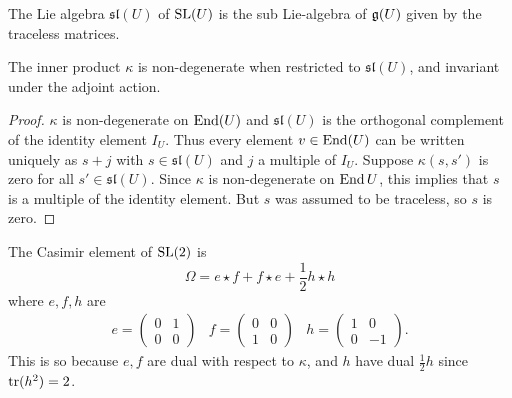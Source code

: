 \documentclass[11pt, english]{article}
\begin{document}
The Lie algebra $\mathfrak{sl}(U)$ of $\operatorname{SL}(U)$ is the sub Lie-algebra of $\mathfrak g(U)$ given by the traceless matrices. 

\begin{lemma}
The inner product $\kappa$ is non-degenerate when restricted to $\mathfrak{sl}(U)$, and invariant under the adjoint action. 
\end{lemma}
\begin{proof}
$\kappa$ is non-degenerate on $\operatorname{End}(U)$ and $\mathfrak{sl}(U)$ is the orthogonal complement of the identity element $I_U$. Thus every element $v \in \operatorname{End}(U)$ can be written uniquely as $s+j$ with $s \in \mathfrak{sl}(U)$ and $j$ a multiple of $I_U$. Suppose $\kappa(s,s')$ is zero for all $s' \in \mathfrak{sl}(U)$. Since $\kappa$ is non-degenerate on $\operatorname{End} U$, this implies that $s$ is a multiple of the identity element. But $s$ was assumed to be traceless, so $s$ is zero. 
\end{proof}

\begin{example}
The Casimir element of $\operatorname{SL}(2)$ is 
\[
\Omega = e \star f + f \star e + \frac 12 h \star h
\]
where $e,f,h$ are
\begin{align*}
  e = 
  \begin{pmatrix}
    0 & 1 \\ 0 & 0 
  \end{pmatrix} &
f = \begin{pmatrix}
0 & 0 \\ 1 & 0 
\end{pmatrix} & 
h = 
\begin{pmatrix}
  1 & 0 \\ 0 & -1
\end{pmatrix}.
\end{align*}
This is so because $e,f$ are dual with respect to $\kappa$, and $h$ have dual $\frac 12 h$ since $\operatorname{tr}(h^2)=2$. 
\end{example}
\end{document}
